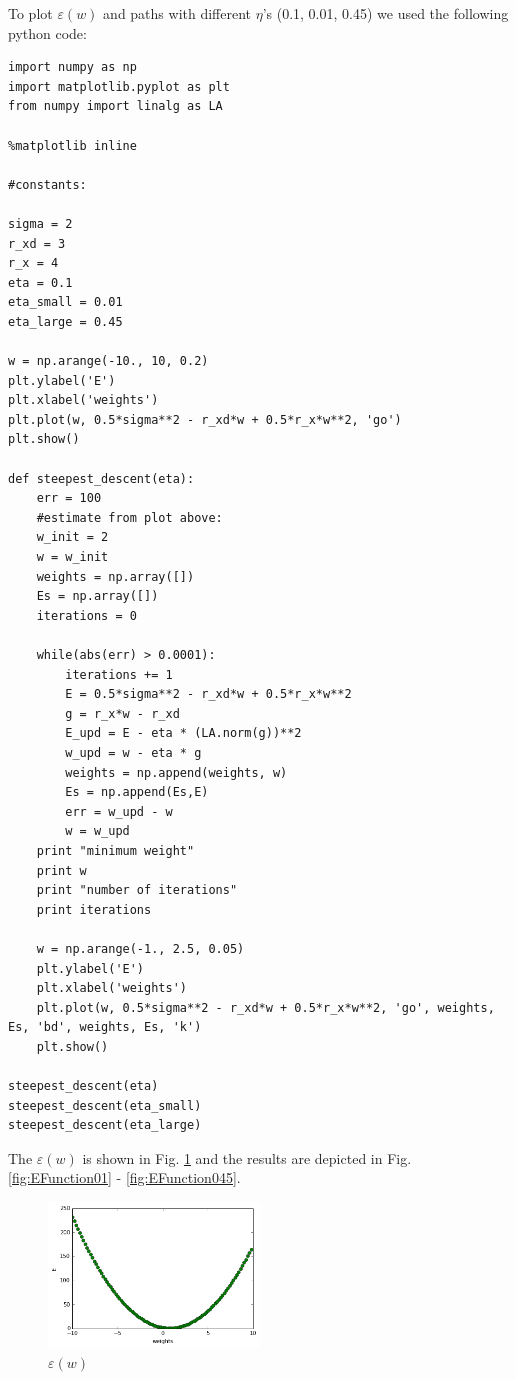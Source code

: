 \documentclass[a4paper, 12pt]{article}
\begin{document}
To plot $\varepsilon(w)$ and paths with different $\eta$'s (0.1, 0.01, 0.45) we used the following python code:

\lstset{language=Python}   
\begin{lstlisting}[frame=single]
import numpy as np
import matplotlib.pyplot as plt
from numpy import linalg as LA

%matplotlib inline 

#constants:

sigma = 2
r_xd = 3
r_x = 4
eta = 0.1
eta_small = 0.01
eta_large = 0.45

w = np.arange(-10., 10, 0.2)
plt.ylabel('E')
plt.xlabel('weights')
plt.plot(w, 0.5*sigma**2 - r_xd*w + 0.5*r_x*w**2, 'go')
plt.show()

def steepest_descent(eta):
    err = 100
    #estimate from plot above:
    w_init = 2
    w = w_init
    weights = np.array([])
    Es = np.array([])
    iterations = 0

    while(abs(err) > 0.0001):
        iterations += 1
        E = 0.5*sigma**2 - r_xd*w + 0.5*r_x*w**2
        g = r_x*w - r_xd
        E_upd = E - eta * (LA.norm(g))**2
        w_upd = w - eta * g
        weights = np.append(weights, w)
        Es = np.append(Es,E)
        err = w_upd - w
        w = w_upd
    print "minimum weight"
    print w   
    print "number of iterations"
    print iterations

    w = np.arange(-1., 2.5, 0.05)
    plt.ylabel('E')
    plt.xlabel('weights')
    plt.plot(w, 0.5*sigma**2 - r_xd*w + 0.5*r_x*w**2, 'go', weights, Es, 'bd', weights, Es, 'k')
    plt.show()
    
steepest_descent(eta)
steepest_descent(eta_small)
steepest_descent(eta_large)
\end{lstlisting}

The $\varepsilon(w)$ is shown in Fig. \ref{fig:EFunction} and the results are depicted in Fig.\ref{fig:EFunction01} - \ref{fig:EFunction045}.

\begin{figure}[h]
  \centering
  \caption{$\varepsilon(w)$ \label{fig:EFunction}}
  \includegraphics[width=0.5\textwidth]{EFunction}
\end{figure}
\end{document}
